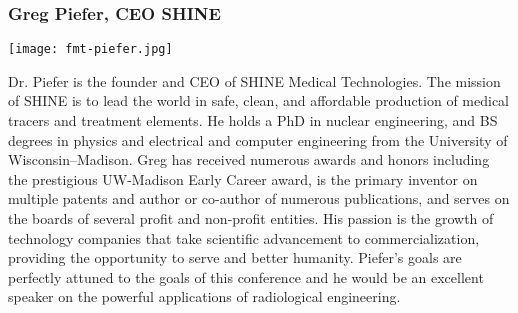 

\subsubsection{Greg Piefer, CEO SHINE}
\begin{minipage}{0.25\textwidth}
	\centering
	\texttt{[image: fmt-piefer.jpg]}
\end{minipage}
\begin{minipage}{0.73\textwidth}
	Dr. Piefer is the founder and CEO of SHINE Medical Technologies. The mission of SHINE is to lead the world in safe, clean, and affordable production of medical tracers and treatment elements. He holds a PhD in nuclear engineering, and BS degrees in physics and electrical and computer engineering from the University of Wisconsin–Madison. Greg has received numerous awards and honors including the prestigious UW-Madison Early Career award, is the primary inventor on multiple patents and author or co-author of numerous publications, and serves on the boards of several profit and non-profit entities. His passion is the growth of technology companies that take scientific advancement to commercialization, providing the opportunity to serve and better humanity. Piefer's goals are perfectly attuned to the goals of this conference and he would be an excellent speaker on the powerful applications of radiological engineering.
\end{minipage}


